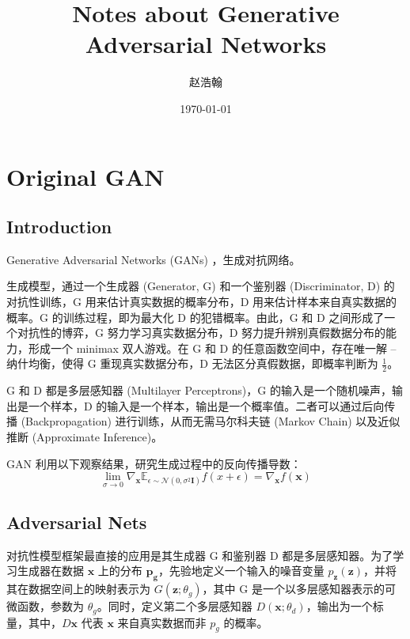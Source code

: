 \documentclass{myarticle}
\title{Notes about Generative Adversarial Networks}
\author{赵浩翰}
\date{\today}
\begin{document}
    \maketitle
    \clearpage
    \tableofcontents
    \clearpage

    \section{Original GAN}

    \subsection{Introduction}
    Generative Adversarial Networks (GANs) \cite{goodfellow_generative_2014}，生成对抗网络。

    生成模型，通过一个生成器 (Generator, G) 和一个鉴别器 (Discriminator, D) 的对抗性训练，G 用来估计真实数据的概率分布，D 用来估计样本来自真实数据的概率。G 的训练过程，即为最大化 D 的犯错概率。由此，G 和 D 之间形成了一个对抗性的博弈，G 努力学习真实数据分布，D 努力提升辨别真假数据分布的能力，形成一个 minimax 双人游戏。在 G 和 D 的任意函数空间中，存在唯一解 -- 纳什均衡，使得 G 重现真实数据分布，D 无法区分真假数据，即概率判断为 $\frac{1}{2}$。

    G 和 D 都是多层感知器 (Multilayer Perceptrons)，G 的输入是一个随机噪声，输出是一个样本，D 的输入是一个样本，输出是一个概率值。二者可以通过后向传播 (Backpropagation) 进行训练，从而无需马尔科夫链 (Markov Chain) 以及近似推断 (Approximate Inference)。

    GAN 利用以下观察结果，研究生成过程中的反向传播导数：
    \begin{equation}
        \lim\limits_{\sigma\to0}\nabla_{\bm{x}}\mathbb{E}_{\epsilon\sim\mathcal{N}(0,\sigma^2\bm{I})}f(x+\epsilon)=\nabla_{\bm{x}}f(\bm{x})
    \end{equation}

    \subsection{Adversarial Nets}
    对抗性模型框架最直接的应用是其生成器 G 和鉴别器 D 都是多层感知器。为了学习生成器在数据 $\bm{x}$ 上的分布 $\bm{p_g}$，先验地定义一个输入的噪音变量 $p_{\bm{z}}(\bm{z})$，并将其在数据空间上的映射表示为 $G(\bm{z};\theta_g)$，其中 G 是一个以多层感知器表示的可微函数，参数为 $\theta_g$。同时，定义第二个多层感知器 $D(\bm{x};\theta_d)$，输出为一个标量，其中，$D{\bm{x}}$ 代表 $\bm{x}$ 来自真实数据而非 $p_g$ 的概率。
\end{document}
